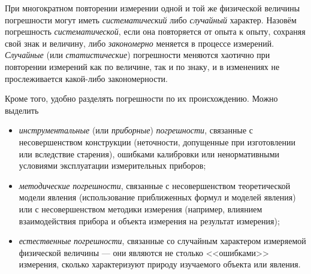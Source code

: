 
При многократном повторении измерении одной и той же физической величины
погрешности могут иметь \emph{систематический} либо \emph{случайный}
характер. Назовём погрешность \emph{систематической}, если она повторяется
от опыта к опыту, сохраняя свой знак и величину, либо \emph{закономерно}
меняется в процессе измерений. \emph{Случайные} (или \emph{статистические})
погрешности меняются хаотично при повторении измерений как по величине,
так и по знаку, и в изменениях не прослеживается какой-либо закономерности.

Кроме того, удобно разделять погрешности по их происхождению. Можно
выделить
\begin{itemize}
    \item \emph{инструментальные} (или \emph{приборные}) \emph{погрешности},
связанные с несовершенством конструкции (неточности, допущенные при
изготовлении или вследствие старения), ошибками калибровки или ненормативными
условиями эксплуатации измерительных приборов;
    \item \emph{методические} \emph{погрешности}, связанные с несовершенством
теоретической модели явления (использование приближенных формул и
моделей явления) или с несовершенством методики измерения (например,
влиянием взаимодействия прибора и объекта измерения на результат измерения);
    \item \emph{естественные} \emph{погрешности}, связанные со случайным характером
измеряемой физической величины --- они являются не столько
<<ошибками>> измерения, сколько характеризуют
природу изучаемого объекта или явления.
\end{itemize}


